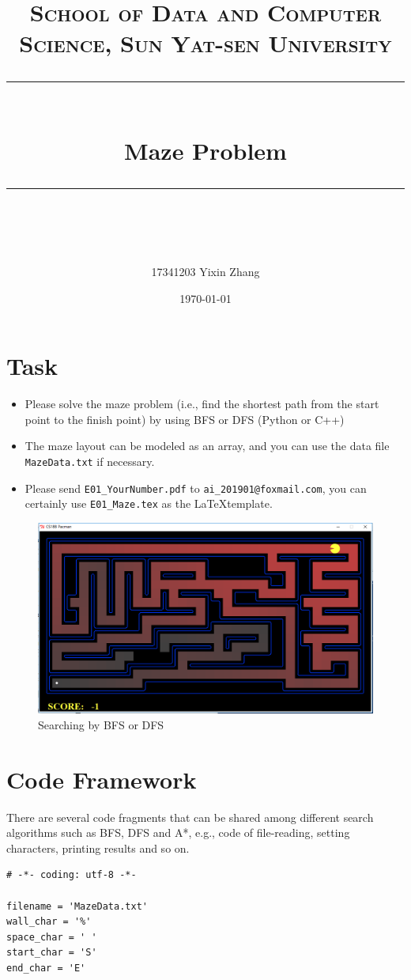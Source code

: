 \documentclass[a4paper, 11pt]{article}
\title{	
\normalfont \normalsize
\textsc{School of Data and Computer Science, Sun Yat-sen University} \\ [25pt] %
\rule{\textwidth}{0.5pt} \\[0.4cm] %
\huge  Maze Problem\\ %
\rule{\textwidth}{2pt} \\[0.5cm] %
\author{17341203 Yixin Zhang}
\date{\normalsize\today}
}
\begin{document}
\maketitle
\tableofcontents
\newpage
\section{Task}



\begin{itemize}
	\item Please solve the maze problem (i.e., find the shortest path from the start point to the finish point) by using BFS or DFS (Python or C++)
	\item The maze layout can be modeled as an array, and you can use the data file \texttt{MazeData.txt} if necessary.
	\item Please send \texttt{E01\_YourNumber.pdf} to \texttt{ai\_201901@foxmail.com}, you can certainly use \texttt{E01\_Maze.tex} as the \LaTeX template.
\end{itemize}

\begin{figure}[ht]
\centering
\includegraphics[width=15cm]{assets/Pacman}
\caption{Searching by BFS or DFS}
\end{figure}

\section{Code Framework}
There are several code fragments that can be shared among different search algorithms such as BFS, DFS and A*, e.g., code of file-reading, setting characters, printing results and so on.

\begin{lstlisting}[title=settings.py]
# -*- coding: utf-8 -*-

filename = 'MazeData.txt'
wall_char = '%'
space_char = ' '
start_char = 'S'
end_char = 'E'
\end{lstlisting}
\end{document}
